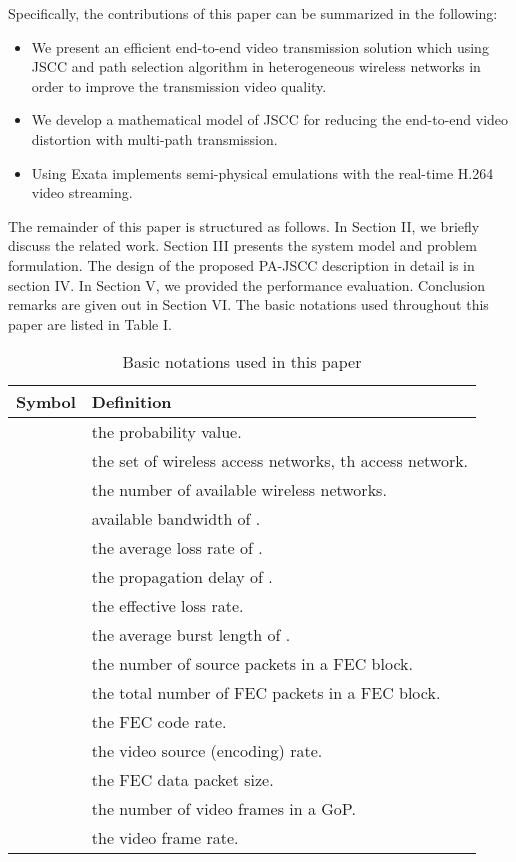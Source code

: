 \documentclass[journal]{IEEEtran}
\begin{document}
Specifically, the contributions of this paper can be summarized in the following:
\begin{itemize}
  \item We present an efficient end-to-end video transmission solution which using JSCC and path selection algorithm in heterogeneous wireless networks in order to improve the transmission video quality.
  \item We develop a mathematical model of JSCC for reducing the end-to-end video distortion with multi-path transmission.
  \item Using Exata implements semi-physical emulations with the real-time H.264 video streaming.
\end{itemize}




The remainder of this paper is structured as follows. In Section II, we briefly discuss the related work. Section III presents the system model and problem formulation. The design of the proposed PA-JSCC description in detail is in section IV. In Section V, we provided the performance evaluation. Conclusion remarks are given out in Section VI. The basic notations used throughout this paper are listed in Table I.
\begin{table}[htbp]
\footnotesize
\renewcommand{\arraystretch}{1}
\caption{Basic notations used in this paper}
      \vspace{-5pt}
        \centering
      \begin{tabular}{|c|l|}
      \hline
       \textbf{Symbol} & \textbf{Definition} \\
        \hline
        \hline
         & the probability value.\\
        \hline
         &  the set of wireless access networks, th access network.\\
        \hline
         & the number of available wireless networks.\\
        \hline
         & available bandwidth of .\\
        \hline
         & the average loss rate of .\\
        \hline
         & the propagation delay of .\\
        \hline
         & the effective loss rate.\\
        \hline
         & the average burst length of .\\
        \hline
         & the number of source packets in a FEC block.\\
        \hline
         & the total number of FEC packets in a FEC block.\\
        \hline
         & the FEC code rate.\\
        \hline
         & the video source (encoding) rate.\\
        \hline
          & the FEC data packet size.\\
        \hline
         & the number of video frames in a GoP.\\
        \hline
          & the video frame rate.\\
        \hline
      \end{tabular}
\end{table}
\normalsize
\end{document}
